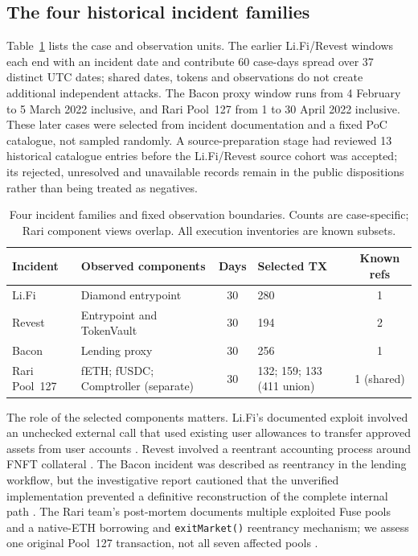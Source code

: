 \documentclass[preprint,12pt,authoryear]{elsarticle}
\begin{document}
\subsection{The four historical incident families}
Table~\ref{tab:cohort} lists the case and observation units. The earlier Li.Fi/Revest windows each end with an incident date and contribute 60 case-days spread over 37 distinct UTC dates; shared dates, tokens and observations do not create additional independent attacks. The Bacon proxy window runs from 4 February to 5 March 2022 inclusive, and Rari Pool~127 from 1 to 30 April 2022 inclusive. These later cases were selected from incident documentation and a fixed PoC catalogue, not sampled randomly. A source-preparation stage had reviewed 13 historical catalogue entries before the Li.Fi/Revest source cohort was accepted; its rejected, unresolved and unavailable records remain in the public dispositions rather than being treated as negatives.

\begin{table}[htbp]
\centering\footnotesize
\caption{Four incident families and fixed observation boundaries. Counts are case-specific; Rari component views overlap. All execution inventories are known subsets.}
\label{tab:cohort}
\begin{tabular}{p{1.8cm}p{3.35cm}c p{2.7cm}c}
\toprule
Incident & Observed components & Days & Selected TX & Known refs \\
\midrule
Li.Fi & Diamond entrypoint & 30 & 280 & 1 \\
Revest & Entrypoint and TokenVault & 30 & 194 & 2 \\
Bacon & Lending proxy & 30 & 256 & 1 \\
Rari Pool~127 & fETH; fUSDC; Comptroller (separate) & 30 & 132; 159; 133 (411 union) & 1 (shared) \\
\bottomrule
\end{tabular}
\end{table}

The role of the selected components matters. Li.Fi's documented exploit involved an unchecked external call that used existing user allowances to transfer approved assets from user accounts \citep{LiFi2022Postmortem,BlockSec2022LiFi}. Revest involved a reentrant accounting process around FNFT collateral \citep{Revest2022Postmortem,SlowMist2022Revest}. The Bacon incident was described as reentrancy in the lending workflow, but the investigative report cautioned that the unverified implementation prevented a definitive reconstruction of the complete internal path \citep{Bacon2022Postmortem,Certik2022Bacon}. The Rari team's post-mortem documents multiple exploited Fuse pools and a native-ETH borrowing and \texttt{exitMarket()} reentrancy mechanism; we assess one original Pool~127 transaction, not all seven affected pools \citep{Rari2022Postmortem,Beosin2022Rari}.
\end{document}
